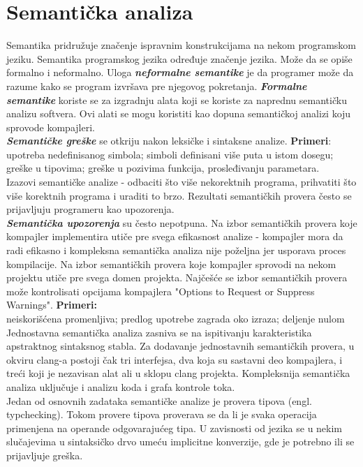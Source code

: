 \documentclass[10pt]{extarticle}
\begin{document}
\section{Semantička analiza}
\noindent
Semantika pridružuje značenje ispravnim konstrukcijama na nekom programskom jeziku. Semantika programskog jezika određuje značenje jezika. Može da se opiše formalno i neformalno. Uloga \textit{\textbf{neformalne semantike}} je da programer može da razume kako se program izvršava pre njegovog pokretanja. 
\textit{\textbf{Formalne semantike}} koriste se za izgradnju alata koji se koriste za naprednu semantičku analizu softvera. Ovi alati se mogu koristiti kao dopuna semantičkoj analizi koju sprovode kompajleri. \\
\textit{\textbf{Semantičke greške}} se otkriju nakon leksičke i sintaksne analize. \textbf{Primeri}: \\
upotreba nedefinisanog simbola; simboli definisani više puta u istom dosegu; greške u tipovima; greške u pozivima funkcija, prosleđivanju parametara. \\
Izazovi semantičke analize - odbaciti što više nekorektnih programa, prihvatiti što više korektnih programa i uraditi to brzo. Rezultati semantičkih provera često se prijavljuju programeru kao upozorenja. \\
\textit{\textbf{Semantička upozorenja}} su često nepotpuna. Na izbor semantičkih provera koje kompajler implementira utiče pre svega efikasnost analize - 
kompajler mora da radi efikasno i kompleksna semantička analiza nije poželjna jer usporava proces kompilacije. 
Na izbor semantičkih provera koje kompajler sprovodi na nekom projektu utiče pre svega domen projekta. Najčešće se izbor semantičkih provera može kontrolisati opcijama kompajlera "Options to Request or Suppress Warnings". \textbf{Primeri:} \\
neiskorišćena promenljiva; predlog upotrebe zagrada oko izraza; deljenje nulom
\\
Jednostavna semantička analiza zasniva se na ispitivanju karakteristika apstraktnog sintaksnog stabla. Za dodavanje jednostavnih semantičkih provera, u okviru clang-a postoji čak tri interfejsa, dva koja su sastavni deo kompajlera, i treći koji je nezavisan alat ali u sklopu
clang projekta. Kompleksnija semantička analiza uključuje i analizu koda i grafa kontrole toka.  \\
Jedan od osnovnih zadataka semantičke analize je provera tipova (engl. typchecking). Tokom provere tipova proverava se da li je svaka operacija primenjena na operande odgovarajućeg tipa. U zavisnosti od jezika se u nekim slučajevima u sintaksičko drvo umeću implicitne konverzije, gde je potrebno ili se prijavljuje greška.
\end{document}
